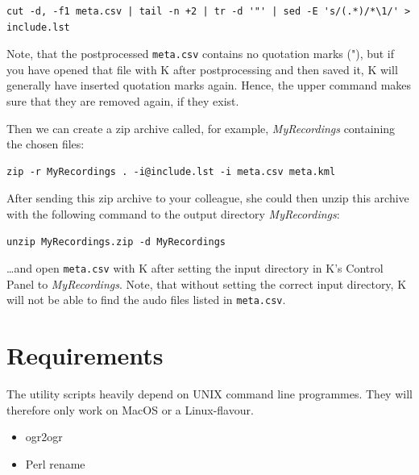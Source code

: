 \documentclass[English, 11pt, twoside, authoryear]{article}
\begin{document}
\begin{lstlisting}
cut -d, -f1 meta.csv | tail -n +2 | tr -d '"' | sed -E 's/(.*)/*\1/' > include.lst
\end{lstlisting}

Note, that the postprocessed \texttt{meta.csv} contains no quotation marks ("), but if you have opened that file with \textsf{K} after postprocessing and then saved it, \textsf{K} will generally have inserted quotation marks again. Hence, the upper command makes sure that they are removed again, if they exist.

Then we can create a zip archive called, for example, \emph{MyRecordings} containing the chosen files:

\begin{lstlisting}
zip -r MyRecordings . -i@include.lst -i meta.csv meta.kml
\end{lstlisting}

After sending this zip archive to your colleague, she could then unzip this archive with the following command to the output directory \emph{MyRecordings}:

\begin{lstlisting}
unzip MyRecordings.zip -d MyRecordings
\end{lstlisting}

\ldots and open \texttt{meta.csv} with \textsf{K} after setting the input directory in \textsf{K}'s Control Panel to \emph{MyRecordings}. Note, that without setting the correct input directory, \textsf{K} will not be able to find the audo files listed in \texttt{meta.csv}.


%
%
%
%

%
%
\section{Requirements}
%
%
The utility scripts heavily depend on UNIX command line programmes. They will therefore only work on MacOS or a Linux-flavour.

\begin{itemize}
\item ogr2ogr
\item Perl rename
\end{itemize}
\end{document}
